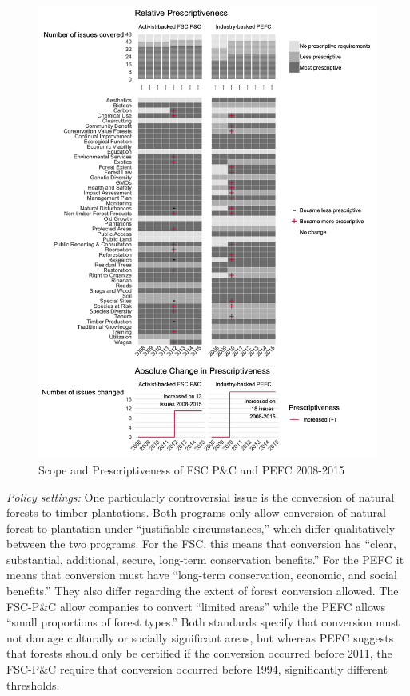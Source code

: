 \documentclass[
      12pt,
            Review ]{article}
\begin{document}
\begin{figure}
\centering
\includegraphics{Figs/FSC-PEFC-1.png}
\caption{Scope and Prescriptiveness of FSC P\&C and PEFC 2008-2015}
\end{figure}

\emph{Policy settings:} One particularly controversial issue is the
conversion of natural forests to timber plantations. Both programs only
allow conversion of natural forest to plantation under ``justifiable
circumstances,'' which differ qualitatively between the two programs.
For the FSC, this means that conversion has ``clear, substantial,
additional, secure, long-term conservation benefits.'' For the PEFC it
means that conversion must have ``long-term conservation, economic, and
social benefits.'' They also differ regarding the extent of forest
conversion allowed. The FSC-P\&C allow companies to convert ``limited
areas'' while the PEFC allows ``small proportions of forest types.''
Both standards specify that conversion must not damage culturally or
socially significant areas, but whereas PEFC suggests that forests
should only be certified if the conversion occurred before 2011, the
FSC-P\&C require that conversion occurred before 1994, significantly
different thresholds.
\end{document}
